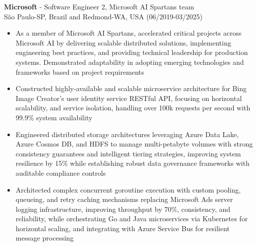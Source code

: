 
\normalsize{\textbf{Microsoft} - Software Engineer 2, Microsoft AI Spartans team}\\
\footnotesize{São Paulo-SP, Brazil and Redmond-WA, USA (06/2019-03/2025)}

\begin{itemize}
    \item \small{As a member of Microsoft AI Spartans, accelerated critical projects across Microsoft AI by delivering scalable distributed solutions, implementing engineering best practices, and providing technical leadership for production systems. Demonstrated adaptability in adopting emerging technologies and frameworks based on project requirements}

    \item \small{Constructed highly-available and scalable microservice architecture for Bing Image Creator's user identity service RESTful API, focusing on horizontal scalability, and service isolation, handling over 100k requests per second with 99.9\% system availability}

    \item \small{Engineered distributed storage architectures leveraging Azure Data Lake, Azure Cosmos DB, and HDFS to manage multi-petabyte volumes with strong consistency guarantees and intelligent tiering strategies, improving system resilience by 15\% while establishing robust data governance frameworks with auditable compliance controls}

    \item \small{Architected complex concurrent goroutine execution with custom pooling, queueing, and retry caching mechanisms replacing Microsoft Ads server logging infrastructure, improving throughput by 70\%, consistency, and reliability, while orchestrating Go and Java microservices via Kubernetes for horizontal scaling, and integrating with Azure Service Bus for resilient message processing}


\end{itemize}
